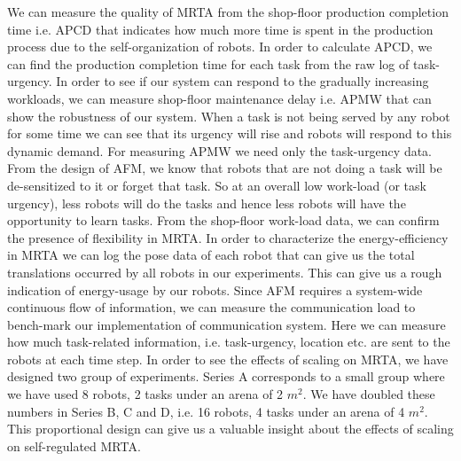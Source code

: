 \documentclass[journal]{IEEEtran}
\begin{document}
We can measure the quality of MRTA from the shop-floor production completion time i.e. APCD that indicates how much more time is  spent in the production process due to the self-organization of robots.  In order to calculate APCD, we can find the production completion time for each task from the raw log of task-urgency.
%
In order to see if our system can respond to the gradually increasing workloads,  we can measure shop-floor maintenance delay i.e. APMW that can show the robustness of our system. When a task is not being served by any robot for some time we can see that its urgency will rise and robots will respond to this dynamic demand. For measuring APMW we need only the task-urgency data.
%
From the design of AFM, we know that robots that are not doing a task will be de-sensitized to it or forget that task. So at an overall low work-load (or task urgency), less robots will do the tasks and hence less robots will have the opportunity to learn tasks. From the shop-floor work-load data, we can confirm the presence of flexibility in MRTA.
%
In order to characterize the energy-efficiency in MRTA we can log the pose data of each robot that can give us the total translations occurred by all robots in our experiments. This can give us a rough indication of energy-usage by our robots. 
%
Since AFM requires a system-wide continuous flow of information, we can measure the communication load to bench-mark our implementation of communication system. Here we can measure  how much task-related information, i.e. task-urgency, location etc. are sent to the robots at each time step. 
%
In order to see the effects of scaling on MRTA, we have designed two group of experiments. Series A corresponds to a small group where we have used 8 robots, 2 tasks under an arena of 2 $m^2$. We have doubled these numbers in Series B, C and D, i.e. 16 robots, 4 tasks under an arena of 4 $m^2$. This proportional design can give us a valuable insight about the effects of scaling on self-regulated MRTA. 
\end{document}
